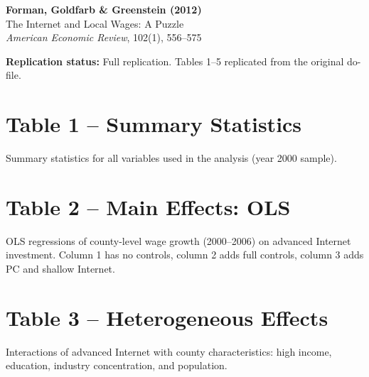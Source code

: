 \documentclass[12pt]{article}
\begin{document}
\begin{center}
{\Large\bfseries Forman, Goldfarb \& Greenstein (2012)}\\
{\large The Internet and Local Wages: A Puzzle}\\
\vspace{0.5em}
{\normalsize \textit{American Economic Review}, 102(1), 556--575}
\end{center}

\vspace{1em}
\noindent\textbf{Replication status:} Full replication.
Tables 1--5 replicated from the original do-file.

\tableofcontents

\clearpage
\section{Table 1 -- Summary Statistics}

Summary statistics for all variables used in the analysis (year 2000 sample).

\vspace{1em}


\clearpage
\section{Table 2 -- Main Effects: OLS}

OLS regressions of county-level wage growth (2000--2006) on
advanced Internet investment. Column 1 has no controls,
column 2 adds full controls, column 3 adds PC and shallow Internet.

\vspace{1em}


\clearpage
\section{Table 3 -- Heterogeneous Effects}

Interactions of advanced Internet with county characteristics:
high income, education, industry concentration, and population.

\vspace{1em}


\clearpage
\end{document}
